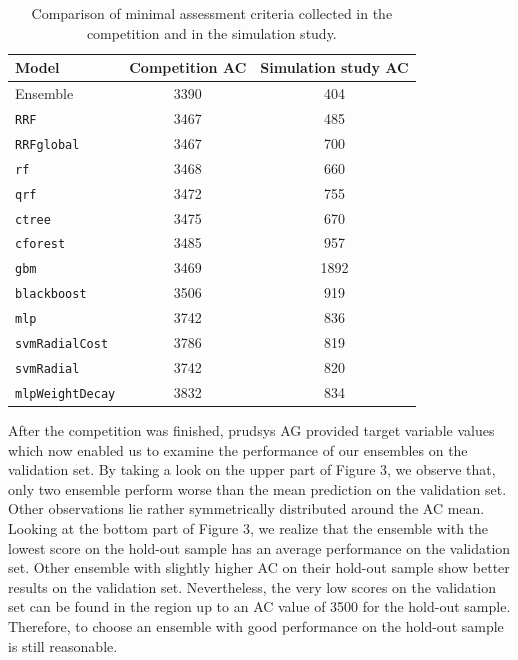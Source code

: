 \documentclass[12pt]{article}
\begin{document}
\begin{table}
\centering
\begin{tabular}{l|cc}
\hline
\hline
Model & Competition AC & Simulation study AC\\
\hline
Ensemble 			& 3390 		& 404\\
\texttt{RRF} 		& 3467 		& 485\\
\texttt{RRFglobal} 	& 3467 		& 700\\
\texttt{rf} 		& 3468 		& 660\\
\texttt{qrf} 		& 3472 		& 755\\
\texttt{ctree} 		& 3475 		& 670\\
\texttt{cforest} 	& 3485 		& 957\\
\texttt{gbm }		& 3469 		& 1892\\
\texttt{blackboost} & 3506 		& 919\\
\texttt{mlp} 		& 3742 		& 836\\
\texttt{svmRadialCost} & 3786 	& 819\\
\texttt{svmRadial} 	& 3742 		& 820\\
\texttt{mlpWeightDecay} & 3832 	& 834\\
\hline
\hline
\end{tabular}
\caption{Comparison of minimal assessment criteria collected in the competition and in the simulation study.}
\end{table}

After the competition was finished, prudsys AG provided target variable values which now enabled us to examine the performance of our ensembles on the validation set. By taking a look on the upper part of Figure 3, we observe that, only two ensemble perform worse than the mean prediction on the validation set. Other observations lie rather symmetrically distributed around the AC mean. Looking at the bottom part of Figure 3, we realize that the ensemble with the lowest score on the hold-out sample has an average performance on the validation set. Other ensemble with slightly higher AC on their hold-out sample show better results on the validation set. Nevertheless, the very low scores on the validation set can be found in the region up to an AC value of 3500 for the hold-out sample. Therefore, to choose an ensemble with good performance on the hold-out sample is still reasonable.\\
\end{document}
